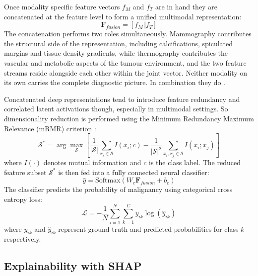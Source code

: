 \documentclass[lettersize,journal]{IEEEtran}
\begin{document}
Once modality specific feature vectors $f_M$ and $f_T$ are in hand they are concatenated at the feature level to form a unified multimodal representation:
\begin{equation}
\mathbf{F}_{fusion} = [f_M \Vert f_T]
\label{eq:concat}
\end{equation}
The concatenation performs two roles simultaneously. Mammography contributes the structural side of the representation, including calcifications, spiculated margins and tissue density gradients, while thermography contributes the vascular and metabolic aspects of the tumour environment, and the two feature streams reside alongside each other within the joint vector. Neither modality on its own carries the complete diagnostic picture. In combination they do \cite{Khan2023Hybrid}.

Concatenated deep representations tend to introduce feature redundancy and correlated latent activations though, especially in multimodal settings. So dimensionality reduction is performed using the Minimum Redundancy Maximum Relevance (mRMR) criterion \cite{Peng2005mRMR}:
\begin{equation}
\mathcal{S}^* = \arg\max_{\mathcal{S}} \left[ \frac{1}{|\mathcal{S}|}\sum_{x_i \in \mathcal{S}} I(x_i; c) - \frac{1}{|\mathcal{S}|^2}\sum_{x_i, x_j \in \mathcal{S}} I(x_i; x_j) \right]
\label{eq:mrmr_code}
\end{equation}
where $I(\cdot)$ denotes mutual information and $c$ is the class label. The reduced feature subset $\mathcal{S}^*$ is then fed into a fully connected neural classifier:
\begin{equation}
\hat{y} = \mathrm{Softmax}(W_c \mathbf{F}_{fusion} + b_c)
\label{eq:classifier_code}
\end{equation}
The classifier predicts the probability of malignancy using categorical cross entropy loss:
\begin{equation}
\mathcal{L} = -\frac{1}{N}\sum_{i=1}^{N}\sum_{k=1}^{C}y_{ik}\log(\hat{y}_{ik})
\label{eq:loss}
\end{equation}
where $y_{ik}$ and $\hat{y}_{ik}$ represent ground truth and predicted probabilities for class $k$ respectively.

\vspace{-0.5em}
\subsection{Explainability with SHAP}
\vspace{-0.2em}
\end{document}
